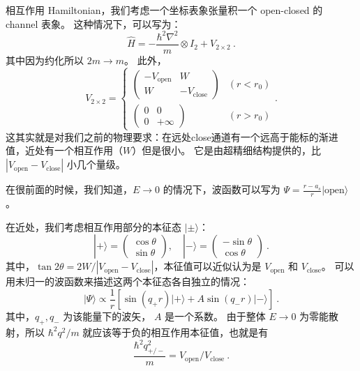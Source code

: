 
相互作用 Hamiltonian，我们考虑一个坐标表象张量积一个 open-closed 的 channel 表象。 这种情况下，可以写为：
\begin{equation}
\hat{H} = -\frac{\hbar^2\nabla^2}{m}\otimes I_2+V_{2\times2}~.
\end{equation}
其中因为约化所以 $2m\to m$。 此外，
\begin{equation}
V_{2\times2} = \begin{cases}
\left(\begin{matrix}
-V_{\text{open}} & W\\
W & -V_{\text{close}}
\end{matrix}\right) & (r < r_0)\\
\left(\begin{matrix}
0 & 0\\
0 & +\infty
\end{matrix}\right) & (r > r_0)
\end{cases} .
\end{equation}
这其实就是对我们之前的物理要求：在远处close通道有一个远高于能标的渐进值，近处有一个相互作用（$W$）但是很小。 它是由超精细结构提供的，比 $|V_{\text{open}}-V_{\text{close}}|$ 小几个量级。

在很前面的时候，我们知道，$E\to0$ 的情况下，波函数可以写为 $\Psi=\frac{r-a_s}{r}|\text{open}\rangle$。

在近处，我们考虑相互作用部分的本征态 $|\pm\rangle$：
\begin{equation}
|+\rangle = \left(\begin{matrix}\cos\theta\\\sin\theta\end{matrix}\right),\quad |-\rangle = \left(\begin{matrix}-\sin\theta\\\cos\theta\end{matrix}\right)~.
\end{equation}
其中，$\tan2\theta = 2W/|V_{\text{open}}-V_{\text{close}}|$，本征值可以近似认为是 $V_{\text{open}}$ 和 $V_{\text{close}}$。 可以用未归一的波函数来描述这两个本征态各自独立的情况：
\begin{equation}
|\Psi\rangle\propto\frac{1}{r}\left[\sin(q_+r)|+\rangle + A\sin(q_-r)|-\rangle\right]~.
\end{equation}
其中，$q_+,q_-$ 为该能量下的波矢， $A$ 是一个系数。 由于整体 $E\to0$ 为零能散射，所以 $\hbar^2q^2/m$ 就应该等于负的相互作用本征值，也就是有
\begin{equation}
\frac{\hbar^2q_{+/-}^2}{m} = V_{\text{open}}/V_{\text{close}}~.
\end{equation}

